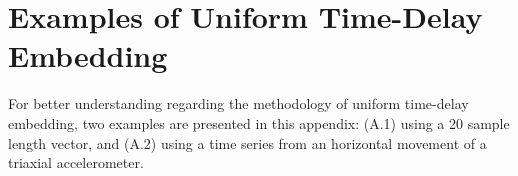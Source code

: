 

\graphicspath{{figs/appendixA/PDF/}}


\chapter{Examples of Uniform Time-Delay Embedding} \label{appendix:a}
%
For better understanding regarding the methodology of uniform time-delay embedding,
two examples are presented in this appendix:
(A.1) using a 20 sample length vector, and
(A.2) using a time series from an horizontal movement of a triaxial
accelerometer.

